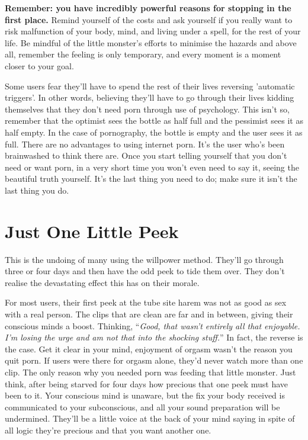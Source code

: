 \documentclass[
]{book}
\begin{document}
\textbf{Remember: you have incredibly powerful reasons for stopping in the first place.} Remind yourself of the costs and ask yourself if you really want to risk malfunction of your body, mind, and living under a spell, for the rest of your life. Be mindful of the little monster's efforts to minimise the hazards and above all, remember the feeling is only temporary, and every moment is a moment closer to your goal.

Some users fear they'll have to spend the rest of their lives reversing 'automatic triggers'. In other words, believing they'll have to go through their lives kidding themselves that they don't need porn through use of psychology. This isn't so, remember that the optimist sees the bottle as half full and the pessimist sees it as half empty. In the case of pornography, the bottle is empty and the user sees it as full. There are no advantages to using internet porn. It's the user who's been brainwashed to think there are. Once you start telling yourself that you don't need or want porn, in a very short time you won't even need to say it, seeing the beautiful truth yourself. It's the last thing you need to do; make sure it isn't the last thing you do.

\hypertarget{just-one-little-peek}{%
\chapter{Just One Little Peek}\label{just-one-little-peek}}

This is the undoing of many using the willpower method. They'll go through three or four days and then have the odd peek to tide them over. They don't realise the devastating effect this has on their morale.

For most users, their first peek at the tube site harem was not as good as sex with a real person. The clips that are clean are far and in between, giving their conscious minds a boost. Thinking, ``\emph{Good, that wasn't entirely all that enjoyable. I'm losing the urge and am not that into the shocking stuff.}'' In fact, the reverse is the case. Get it clear in your mind, enjoyment of orgasm wasn't the reason you quit porn. If users were there for orgasm alone, they'd never watch more than one clip. The only reason why you needed porn was feeding that little monster. Just think, after being starved for four days how precious that one peek must have been to it. Your conscious mind is unaware, but the fix your body received is communicated to your subconscious, and all your sound preparation will be undermined. They'll be a little voice at the back of your mind saying in spite of all logic they're precious and that you want another one.
\end{document}

